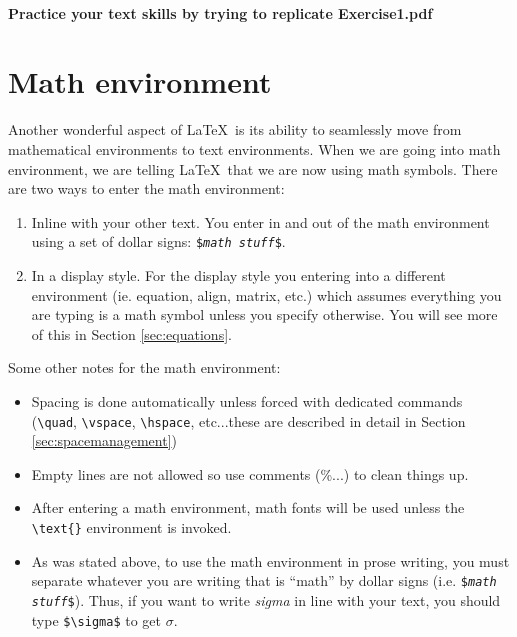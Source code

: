 \documentclass[]{article}%
\newcommand{\bs}{\textbackslash}
\newcommand{\TT}[1]{\texttt{#1}}
\newcommand{\tpc}{\textperiodcentered}
\theoremstyle{definition}
\begin{document}
	\paragraph{Practice your text skills by trying to replicate Exercise1.pdf}
	\clearpage
	
	
	
	
	\section{Math environment}
	\label{sec:math}
	Another wonderful aspect of \LaTeX\ is its ability to seamlessly move from mathematical environments to text environments.
	When we are going into math environment, we are telling \LaTeX\ that we are now using math symbols.
	There are two ways to enter the math environment:
	\begin{enumerate}
		\item Inline with your other text.
		You enter in and out of the math environment using a set of dollar signs: \TT{\$\textit{math stuff}\$}.
		\item In a display style.
		For the display style you entering into a different environment (ie. equation, align, matrix, etc.) which assumes everything you are typing is a math symbol unless you specify otherwise.
		You will see more of this in Section \ref{sec:equations}.  
	\end{enumerate}
	Some other notes for the math environment: 
	\begin{itemize}
		\item Spacing is done automatically unless forced with dedicated commands (\texttt{\bs quad}, \texttt{\bs vspace}, \texttt{\bs hspace}, etc...these are described in detail in Section \ref{sec:spacemanagement})
		\item Empty lines are not allowed so use comments (\%...) to clean things up.
		\item After entering a math environment, math fonts will be used unless the \texttt{\bs text\{\tpc\}} environment is invoked.
		\item As was stated above, to use the math environment in prose writing, you must separate whatever you are writing that is ``math'' by dollar signs (i.e. \TT{\$\textit{math stuff}\$}).
		Thus, if you want to write \emph{sigma} in line with your text, you should type \TT{\$\bs sigma\$} to get $\sigma$.
	\end{itemize}
\end{document}
